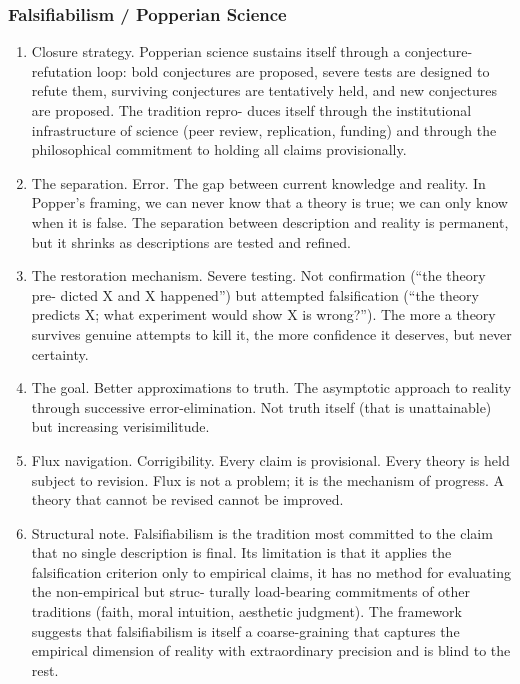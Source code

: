 \documentclass[
]{article}
\providecommand{\tightlist}{%
  \setlength{\itemsep}{0pt}\setlength{\parskip}{0pt}}
\begin{document}
\subsubsection{Falsifiabilism / Popperian
Science}\label{falsifiabilism-popperian-science}

\begin{enumerate}
\def\labelenumi{\arabic{enumi}.}
\setcounter{enumi}{129}
\tightlist
\item
  Closure strategy. Popperian science sustains itself through a
  conjecture-refutation loop: bold conjectures are proposed, severe
  tests are designed to refute them, surviving conjectures are
  tentatively held, and new conjectures are proposed. The tradition
  repro- duces itself through the institutional infrastructure of
  science (peer review, replication, funding) and through the
  philosophical commitment to holding all claims provisionally.
\item
  The separation. Error. The gap between current knowledge and reality.
  In Popper's framing, we can never know that a theory is true; we can
  only know when it is false. The separation between description and
  reality is permanent, but it shrinks as descriptions are tested and
  refined.
\item
  The restoration mechanism. Severe testing. Not confirmation (``the
  theory pre- dicted X and X happened'') but attempted falsification
  (``the theory predicts X; what experiment would show X is wrong?'').
  The more a theory survives genuine attempts to kill it, the more
  confidence it deserves, but never certainty.
\item
  The goal. Better approximations to truth. The asymptotic approach to
  reality through successive error-elimination. Not truth itself (that
  is unattainable) but increasing verisimilitude.
\item
  Flux navigation. Corrigibility. Every claim is provisional. Every
  theory is held subject to revision. Flux is not a problem; it is the
  mechanism of progress. A theory that cannot be revised cannot be
  improved.
\item
  Structural note. Falsifiabilism is the tradition most committed to the
  claim that no single description is final. Its limitation is that it
  applies the falsification criterion only to empirical claims, it has
  no method for evaluating the non-empirical but struc- turally
  load-bearing commitments of other traditions (faith, moral intuition,
  aesthetic judgment). The framework suggests that falsifiabilism is
  itself a coarse-graining that captures the empirical dimension of
  reality with extraordinary precision and is blind to the rest.
\end{enumerate}
\end{document}
